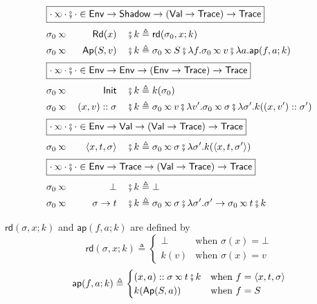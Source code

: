\begin{alignat*}{3}
  \intertext{\hfill\fbox{$\cdot\semlink\cdot\fatsemi\cdot\in\Ctx\rightarrow\Event\rightarrow(\Value\to\textsf{Trace})\rightarrow\textsf{Trace}$}}
  \sigma_0\semlink{} &  & \textsf{Rd}(x)             &  & {}\fatsemi k\triangleq{} & \textsf{rd}(\sigma_0,x;k)                                                                                \\
  \sigma_0\semlink{} &  & \textsf{Ap}(S,v)           &  & {}\fatsemi k\triangleq{} & \sigma_0\semlink S\fatsemi\lambda f.\sigma_0\semlink v\fatsemi\lambda a.\textsf{ap}(f,a;k)               \\
  \intertext{\hfill\fbox{$\cdot\semlink\cdot\fatsemi\cdot\in\Ctx\rightarrow\Ctx\rightarrow(\Ctx\to\textsf{Trace})\rightarrow\textsf{Trace}$}}
  \sigma_0\semlink{} &  & \textsf{Init}              &  & {}\fatsemi k\triangleq{} & k(\sigma_0)                                                                                              \\
  \sigma_0\semlink{} &  & (x,v)\cons\sigma           &  & {}\fatsemi k\triangleq{} & \sigma_0\semlink v\fatsemi\lambda v'.\sigma_0\semlink\sigma\fatsemi\lambda \sigma'.k((x,v')\cons\sigma') \\
  \intertext{\hfill\fbox{$\cdot\semlink\cdot\fatsemi\cdot\in\Ctx\rightarrow\Value\rightarrow(\Value\to\textsf{Trace})\rightarrow\textsf{Trace}$}}
  \sigma_0\semlink{} &  & \langle x,t,\sigma \rangle &  & {}\fatsemi k\triangleq{} & \sigma_0\semlink\sigma\fatsemi\lambda \sigma'.k(\langle x,t,\sigma'\rangle)                              \\
  \intertext{\hfill\fbox{$\cdot\semlink\cdot\fatsemi\cdot\in\Ctx\rightarrow\textsf{Trace}\rightarrow(\Value\to\textsf{Trace})\rightarrow\textsf{Trace}$}}
  \sigma_0\semlink{} &  & \bot                       &  & {}\fatsemi k\triangleq{} & \bot                                                                                                     \\
  \sigma_0\semlink{} &  & \sigma\rightarrow t        &  & {}\fatsemi k\triangleq{} & \sigma_0\semlink\sigma\fatsemi\lambda\sigma'.\sigma'\rightarrow \sigma_0\semlink t\fatsemi k
\end{alignat*}

$\textsf{rd}(\sigma,x;k)$ and $\textsf{ap}(f,a;k)$ are defined by
\[
  \textsf{rd}(\sigma,x;k)\triangleq
  \begin{cases}
    \bot & \text{when }\sigma(x)=\bot \\
    k(v) & \text{when }\sigma(x)=v
  \end{cases}
\]
\[
  \textsf{ap}(f,a;k)\triangleq
  \begin{cases}
    (x,a)\cons\sigma\semlink t\fatsemi k & \text{when }f=\langle x,t,\sigma \rangle \\
    k(\textsf{Ap}(S,a))                  & \text{when }f=S
  \end{cases}
\]

